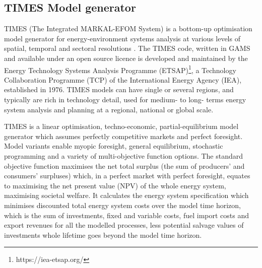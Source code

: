 \documentclass[gmd,manuscript]{copernicus}
\begin{document}
\subsection{TIMES Model generator}
\label{ss:times_code}
TIMES (The Integrated MARKAL-EFOM System) is a bottom-up optimisation model generator for energy-environment systems analysis at various levels of spatial, temporal and sectoral resolutions \citep{Loulou2016a,Loulou2016}. The TIMES code, written in GAMS and available under an open source licence \citep{IEA-ETSAP2020a} is developed and maintained by the Energy Technology Systems Analysis Programme (ETSAP)\footnote{https://iea-etsap.org/}, a Technology Collaboration Programme (TCP) of the International Energy Agency (IEA), established in 1976. TIMES models can have single or several regions, and typically are rich in technology detail, used for medium- to long- terms energy system analysis and planning at a regional, national or global scale. 

TIMES is a linear optimisation, techno-economic, partial-equilibrium model generator which assumes perfectly competitive markets and perfect foresight. Model variants enable myopic foresight, general equilibrium, stochastic programming and a variety of multi-objective function options. The standard objective function maximises the net total surplus (the sum of producers’ and consumers’ surpluses) which, in a perfect market with perfect foresight, equates to maximising the net present value (NPV) of the whole energy system, maximising societal welfare. It calculates the energy system specification which minimises discounted total energy system costs over the model time horizon, which is the sum of investments, fixed and variable costs, fuel import costs and export revenues for all the modelled processes, less potential salvage values of investments whole lifetime goes beyond the model time horizon. 
\end{document}
